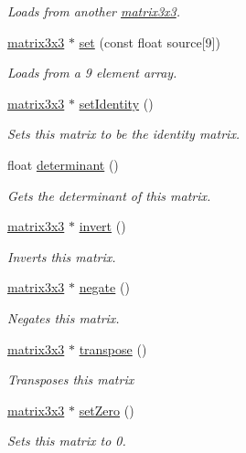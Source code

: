 \begin{DoxyCompactItemize}
\begin{DoxyCompactList}\small\item\em Loads from another \hyperlink{classflounder_1_1matrix3x3}{matrix3x3}. \end{DoxyCompactList}\item 
\hyperlink{classflounder_1_1matrix3x3}{matrix3x3} $\ast$ \hyperlink{classflounder_1_1matrix3x3_a8afe0392663cacadae79be59c612def4}{set} (const float source\mbox{[}9\mbox{]})
\begin{DoxyCompactList}\small\item\em Loads from a 9 element array. \end{DoxyCompactList}\item 
\hyperlink{classflounder_1_1matrix3x3}{matrix3x3} $\ast$ \hyperlink{classflounder_1_1matrix3x3_a64d71b44dc94a221da4ed01ac5cbcbf8}{set\+Identity} ()
\begin{DoxyCompactList}\small\item\em Sets this matrix to be the identity matrix. \end{DoxyCompactList}\item 
float \hyperlink{classflounder_1_1matrix3x3_a6c25560ee28e4d9190fe33b4559dd4e1}{determinant} ()
\begin{DoxyCompactList}\small\item\em Gets the determinant of this matrix. \end{DoxyCompactList}\item 
\hyperlink{classflounder_1_1matrix3x3}{matrix3x3} $\ast$ \hyperlink{classflounder_1_1matrix3x3_add38efb997787cf7e335ad35f8f34311}{invert} ()
\begin{DoxyCompactList}\small\item\em Inverts this matrix. \end{DoxyCompactList}\item 
\hyperlink{classflounder_1_1matrix3x3}{matrix3x3} $\ast$ \hyperlink{classflounder_1_1matrix3x3_a708825b3079c7c8626cd84095d292021}{negate} ()
\begin{DoxyCompactList}\small\item\em Negates this matrix. \end{DoxyCompactList}\item 
\hyperlink{classflounder_1_1matrix3x3}{matrix3x3} $\ast$ \hyperlink{classflounder_1_1matrix3x3_a2cfe1b42645dda116f8251ef183c4028}{transpose} ()
\begin{DoxyCompactList}\small\item\em Transposes this matrix \end{DoxyCompactList}\item 
\hyperlink{classflounder_1_1matrix3x3}{matrix3x3} $\ast$ \hyperlink{classflounder_1_1matrix3x3_abcc962b1acd586ec1f3ad554f1eb32f7}{set\+Zero} ()
\begin{DoxyCompactList}\small\item\em Sets this matrix to 0. \end{DoxyCompactList}\end{DoxyCompactItemize}
